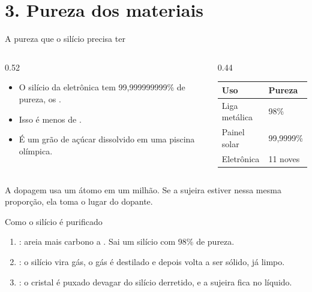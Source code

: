 \section{3. Pureza dos materiais}

\begin{frame}{A pureza que o silício precisa ter}
  \begin{columns}[T]
    \begin{column}{0.52\linewidth}
      \begin{itemize}
        \item O silício da eletrônica tem \alert{99,999999999\%} de pureza,
              os .
        \item Isso é menos de .
        \item É um grão de açúcar dissolvido em uma piscina olímpica.
      \end{itemize}
    \end{column}
    \begin{column}{0.44\linewidth}
      \small
      \begin{table}
        \centering
        \begin{tabular}{ll}
          \toprule
          \textbf{Uso} & \textbf{Pureza} \\
          \midrule
          Liga metálica & 98\% \\
          Painel solar  & 99,9999\% \\
          Eletrônica    & 11 noves \\
          \bottomrule
        \end{tabular}
      \end{table}
    \end{column}
  \end{columns}
  \vspace{0.4cm}
  \centering\small
  A dopagem usa um átomo em um milhão. Se a sujeira estiver nessa mesma
  proporção, ela toma o lugar do dopante.
\end{frame}

\begin{frame}{Como o silício é purificado}
  \begin{enumerate}
    \item {}: areia mais carbono a . Sai um silício com
          98\% de pureza.
    \item {}: o silício vira gás, o gás é destilado e depois
          volta a ser sólido, já limpo.
    \item {}: o cristal é puxado devagar do silício
          derretido, e a sujeira fica no líquido.
  \end{enumerate}
  \vspace{0.4cm}
\end{frame}

